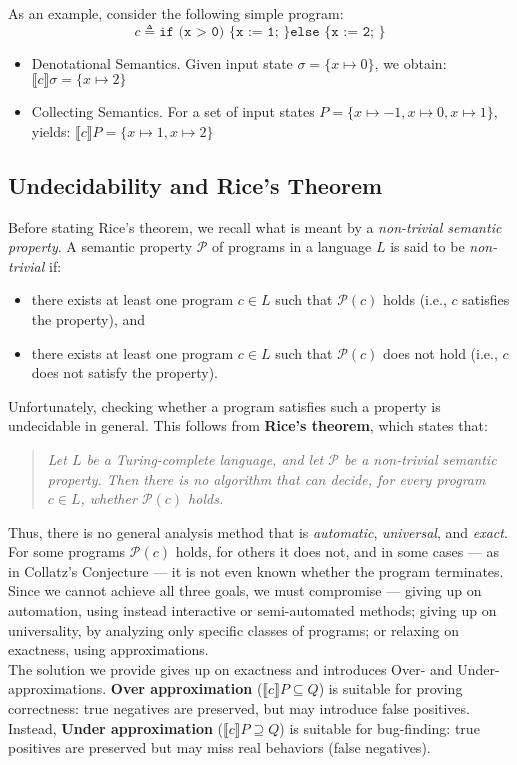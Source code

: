 \documentclass[parskip=half]{scrartcl}
\begin{document}
As an example, consider the following simple program:
\[
c \triangleq \texttt{if (x > 0) \{ x := 1; \} else \{ x := 2; \}}
\]
\begin{itemize}
    \item Denotational Semantics. Given input state \( \sigma = \{ x \mapsto 0 \} \), we obtain: \( \llbracket c \rrbracket \sigma = \{ x \mapsto 2 \} \)
    \item Collecting Semantics. For a set of input states \( P = \{ x \mapsto -1, x \mapsto 0, x \mapsto 1 \} \), yields:
    $\llbracket c \rrbracket P = \{ x \mapsto 1, x \mapsto 2 \}$    
\end{itemize}

\subsection{Undecidability and Rice's Theorem}
Before stating Rice's theorem, we recall what is meant by a \emph{non-trivial semantic property}. A semantic property $\mathcal{P}$ of programs in a language $L$ is said to be \emph{non-trivial} if:

\begin{itemize}
  \item there exists at least one program $c \in L$ such that $\mathcal{P}(c)$ holds (i.e., $c$ satisfies the property), and
  \item there exists at least one program $c \in L$ such that $\mathcal{P}(c)$ does not hold (i.e., $c$ does not satisfy the property).
\end{itemize}

Unfortunately, checking whether a program satisfies such a property is undecidable in general. This follows from \textbf{Rice’s theorem}, which states that:

\begin{quote}
\emph{Let \( L \) be a Turing-complete language, and let \( \mathcal{P} \) be a non-trivial semantic property. Then there is no algorithm that can decide, for every program \( c \in L \), whether \( \mathcal{P}(c) \) holds.}
\end{quote}

Thus, there is no general analysis method that is \emph{automatic}, \emph{universal}, and \emph{exact}.
For some programs \( \mathcal{P}(c) \) holds, for others it does not, and in some cases — as in Collatz’s Conjecture — it is not even known whether the program terminates.
\\ Since we cannot achieve all three goals, we must compromise — giving up on automation, using instead interactive or semi-automated methods; giving up on universality, by analyzing only specific classes of programs; or relaxing on exactness, using approximations.
\\ The solution we provide gives up on exactness and introduces Over- and Under- approximations.
\textbf{Over approximation} ($\llbracket c \rrbracket P \subseteq Q$) is suitable for proving correctness: true negatives are preserved, but may introduce false positives.
Instead, \textbf{Under approximation} ($\llbracket c \rrbracket P \supseteq Q$) is suitable for bug-finding: true positives are preserved but may miss real behaviors (false negatives).
\end{document}
